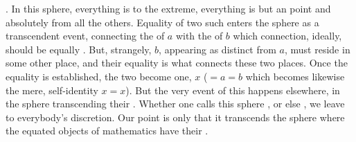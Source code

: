 . In this sphere, everything is  to the extreme,
everything is but an  point  and absolutely
 from all the others. Equality of two such  enters
the sphere as a transcendent event, connecting the  of $a$ with
the  of $b$ which connection, ideally, should be equally
. But, strangely, $b$, appearing as distinct from $a$, must reside
in some other place, and their equality is what connects these two places. Once
the equality is established, the two become one,  $x$ ($=a=b$
which becomes likewise the mere,  self-identity $x=x$). 
But the very event of this  happens elsewhere, in the sphere
transcending their . Whether one calls this sphere ,  or else , we leave to everybody's discretion. Our point is only that it
transcends the sphere  where the equated objects of mathematics
have their . 

